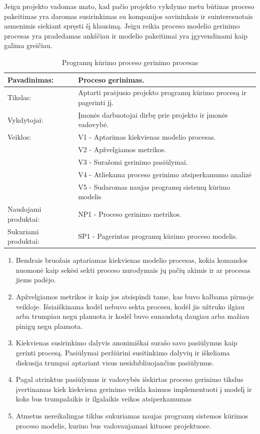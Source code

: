 \documentclass{VUMIFPSkursinis}
\begin{document}
				Jeigu projekto vadomas mato, kad pačio projekto vykdymo metu būtinas proceso pakeitimas yra daromas susirinkimas su kompanijos savininkais ir suinteresuotais asmenimis siekiant spręsti šį klausimą. 
				Jeigu reikia proceso modelio gerinimo procesas yra pradedamas ankščiau ir modelio pakeitimai yra įgyvendinami kaip galima greičiau.
	\begin{center}
		\begin{table}[ht]
			\caption{Programų kūrimo proceso gerinimo procesas}
			\begin{tabular}{ | l | l | }
				\hline
				Pavadinimas:		& Proceso gerinimas.						\\ \hline
				Tikslas:		& Aptarti praėjusio projekto programų kūrimo procesą ir pagerinti jį.			\\ \hline
				Vykdytojai:		& Įmonės darbuotojai dirbę prie projekto ir įmonės vadovybė.					\\ \hline
				Veiklos:		& V1 - Aptarimas kiekvienas modelio procesas. 				\\
							& V2 - Apžvelgiamos metrikos.	\\
							& V3 - Surašomi gerinimo pasiūlymai.				\\ 
							& V4 - Atliekama proceso gerinimo atsiperkamumo analizė \\ 
							& V5 - Sudaromas naujas programų sistemų kūrimo modelis \\ \hline
				Naudojami produktai:	& NP1 - Proceso gerinimo metrikos. 				\\ \hline
				Sukuriami produktai:	& SP1 - Pagerintas programų kūrimo proceso modelis.		\\ \hline
			\end{tabular}
		\end{table}
	\end{center}

	\begin{enumerate}
		\item{Bendrais bruožais aptariamas kiekvienas modelio procesas, kokia komandos nuomonė kaip sekėsi sekti proceso nurodymais jų pačių akimis ir ar procesas jiems padėjo.}
		\item{Apžvelgiamos metrikos ir kaip jos atsispindi tame, kas buvo kalbama pirmoje veikloje. 
			Išsiaiškinama kodėl nebuvo sekta procesu, kodėl jis užtruko ilgiau arba trumpiau negu planuota ir kodėl buvo sunaudotą daugiau arba mažiau pinigų negu planuota.}
		\item{Kiekvienas susirinkimo dalyvis anonimiškai surašo savo pasiūlymus kaip gerinti procesą.
			Pasiūlymai peržiūrini susitinkimo dalyvių ir iškeliama diskusija trumpai aptariant visus nesidubliuojančius pasiūlymus.}
		\item{Pagal atrinktus pasiūlymus ir vadovybės išskirtas proceso gerinimo tikslus įvertinamas kiek kiekviena gerinimo veikla kainuos implementuoti į modelį ir koks bus trumpalaikis ir ilgalaikis veikos atsiperkamumas}
		\item{Atmetus nereikalingas tiklus sukuriamas naujas programų sistemos kūrimos proceso modelis, kuriuo bus vadovaujamasi kituose projektuose.}
	\end{enumerate}
\end{document}
